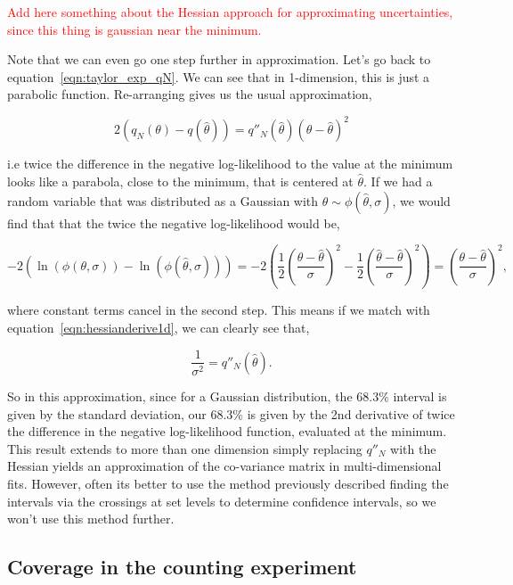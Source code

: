 \textcolor{red}{Add here something about the Hessian approach for approximating uncertainties, since this thing is gaussian near the minimum.}

Note that we can even go one step further in approximation. Let's go back to equation~\ref{eqn:taylor_exp_qN}. We can see that in 1-dimension, this is just a parabolic function. Re-arranging gives us the usual approximation,

\begin{equation}\label{eqn:hessianderive1d}
    2(q_{N}(\theta)-q(\hat{\theta})) = q''_{N}(\hat{\theta})(\theta-\hat{\theta})^{2}
\end{equation}

i.e twice the difference in the negative log-likelihood to the value at the minimum looks like a parabola, close to the minimum, that is centered at $\hat{\theta}$. If we had a random variable that was distributed as a Gaussian with $\theta\sim \phi(\hat{\theta},\sigma)$, we would find that that the twice the negative log-likelihood would be, 

\begin{equation}
-2\left(\ln(\phi(\theta,\sigma)) - \ln(\phi(\hat{\theta},\sigma)) \right)
= -2\left( \frac{1}{2}\left(\frac{\theta-\hat{\theta}}{\sigma}\right)^{2} - \frac{1}{2}\left(\frac{\hat{\theta}-\hat{\theta}}{\sigma}\right)^2\right)  
= \left(\frac{\theta-\hat{\theta}}{\sigma}\right)^{2},
\end{equation}

where constant terms cancel in the second step. This means if we match with equation~\ref{eqn:hessianderive1d}, we can clearly see that,

\begin{equation}
\frac{1}{\sigma^{2}} = q''_{N}(\hat{\theta}).
\end{equation}

So in this approximation, since for a Gaussian distribution, the 68.3\% interval is given by the standard deviation, our 68.3\% is given by the 2nd derivative of twice the difference in the negative log-likelihood function, evaluated at the minimum. This result extends to more than one dimension simply replacing $q''_{N}$ with the Hessian yields an approximation of the  co-variance matrix in multi-dimensional fits. However, often its better to use the method previously described finding the intervals via the crossings at set levels to determine confidence intervals, so we won't use this method further.  

\subsection{Coverage in the counting experiment}

